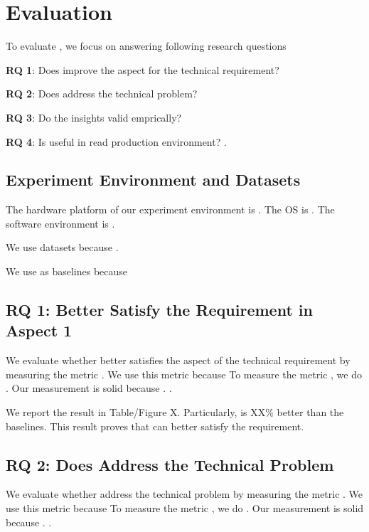 \section{Evaluation}\label{section5}
To evaluate \toolname, we focus on answering following research questions



\textbf{RQ 1}: Does \toolname improve the aspect \blank{} for the technical requirement? 


\textbf{RQ 2}: Does \toolname address the technical problem?

\textbf{RQ 3}: Do the insights valid emprically?


\textbf{RQ 4}: Is \toolname useful in read production environment? .

\subsection{Experiment Environment and Datasets}
The hardware platform of our experiment environment is \blank{}. The OS is \blank{}. The software environment is \blank{}. 

We use \blank{} datasets because \blank{}. 

We use \blank{} as baselines because \blank{}


\subsection{RQ 1: Better Satisfy the Requirement in Aspect 1}
We evaluate whether \toolname better satisfies the aspect \blank{} of the technical requirement by measuring the metric \blank{}. We use this metric because   To measure the metric  \blank{}, we do \blank{}. Our measurement is solid because \blank{}. .

We report the result in Table/Figure X. Particularly, \toolname is XX\% better than the baselines. This result proves that \toolname can better satisfy the requirement. 


\subsection{RQ 2: Does \toolname Address the Technical Problem}
We evaluate whether \toolname address the technical problem \blank{} by measuring the metric \blank{}. We use this metric because   To measure the metric  \blank{}, we do \blank{}. Our measurement is solid because \blank{}. .

